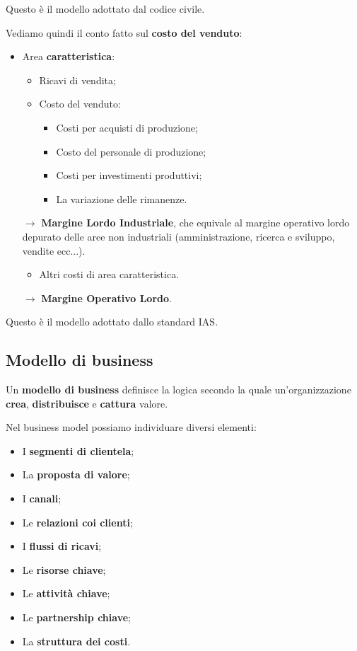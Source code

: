 \documentclass[a4paper,11pt]{article}
\begin{document}
Questo è il modello adottato dal codice civile.

Vediamo quindi il conto fatto sul \textbf{costo del venduto}:
\begin{itemize}
	\item Area \textbf{caratteristica}:
		\begin{itemize}
			\item Ricavi di vendita;
			\item Costo del venduto:
				\begin{itemize}
					\item Costi per acquisti di produzione;
					\item Costo del personale di produzione;
					\item Costi per investimenti produttivi;
					\item La variazione delle rimanenze.
				\end{itemize}
		\end{itemize}
		$\rightarrow$ \textbf{Margine Lordo Industriale}, che equivale al margine operativo lordo depurato delle aree non industriali (amministrazione, ricerca e sviluppo, vendite ecc...).
		\begin{itemize}
			\item Altri costi di area caratteristica.
		\end{itemize}
		$\rightarrow$ \textbf{Margine Operativo Lordo}.

\end{itemize}

Questo è il modello adottato dallo standard IAS.

\subsection{Modello di business}
Un \textbf{modello di business} definisce la logica secondo la quale un'organizzazione \textbf{crea}, \textbf{distribuisce} e \textbf{cattura} valore.

Nel business model possiamo individuare diversi elementi:
\begin{itemize}
	\item I \textbf{segmenti di clientela};
	\item La \textbf{proposta di valore};
	\item I \textbf{canali};
	\item Le \textbf{relazioni coi clienti};
	\item I \textbf{flussi di ricavi};
	\item Le \textbf{risorse chiave};
	\item Le \textbf{attività chiave};
	\item Le \textbf{partnership chiave};
	\item La \textbf{struttura dei costi}.
\end{itemize}
\end{document}
